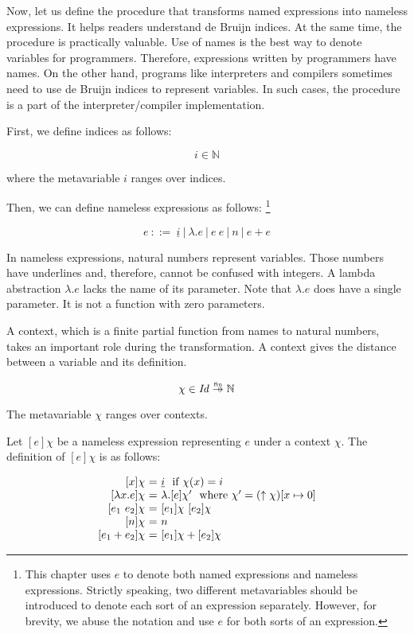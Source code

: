 Now, let us define the procedure that transforms named expressions into nameless
expressions. It helps readers understand de Bruijn indices. At the same time, the
procedure is practically valuable. Use of names is the best way to denote
variables for programmers. Therefore, expressions written by programmers have
names. On the other hand, programs like interpreters and compilers sometimes need
to use de Bruijn indices to represent variables. In such cases, the procedure is
a part of the interpreter/compiler implementation.

First, we define indices as follows:

\[ i \in \mathbb{N} \]

where the metavariable $i$ ranges over indices.

Then, we can define nameless expressions as follows:
\footnote{This chapter uses $e$ to denote both named expressions and nameless
expressions. Strictly speaking, two different metavariables should be introduced
to denote each sort of an expression separately. However, for brevity, we abuse
the notation and use $e$ for both sorts of an expression.}

\[
e\ ::= \ \underline{i}
\ |\ \lambda.e
\ |\ e\ e
\ |\ n
\ |\ e+e
\]

In nameless expressions, natural numbers represent variables. Those numbers have
underlines and, therefore, cannot be confused with integers. A lambda
abstraction $\lambda.e$ lacks the name of its parameter. Note that
$\lambda.e$ does have a single parameter. It is not a function with zero
parameters.

A context, which is a finite partial function from names to natural
numbers, takes an important role during the transformation. A context gives the
distance between a variable and its definition.

\[\chi\in\embox{Id}\finto\mathbb{N}\]

The metavariable $\chi$ ranges over contexts.

Let $[e]\chi$ be a nameless expression representing $e$ under a context $\chi$.
The definition of $[e]\chi$ is as follows:

\[
  \begin{array}{r@{~}c@{~}l}
  \lbrack x\rbrack \chi &=& \underline{i}\ \ \text{if}\ \chi(x)=i \\
  \lbrack \lambda x.e\rbrack \chi &=& \lambda.\lbrack e\rbrack {\chi'}\ \ \text{where}\
  \chi'=(\uparrow\chi)\lbrack x\mapsto 0\rbrack  \\
  \lbrack e_1\ e_2\rbrack \chi &=& \lbrack e_1\rbrack \chi\ \lbrack e_2\rbrack \chi \\
  \lbrack n\rbrack \chi &=& n \\
  \lbrack e_1+e_2\rbrack \chi &=& \lbrack e_1\rbrack \chi+\lbrack e_2\rbrack \chi \\
  \end{array}
\]

